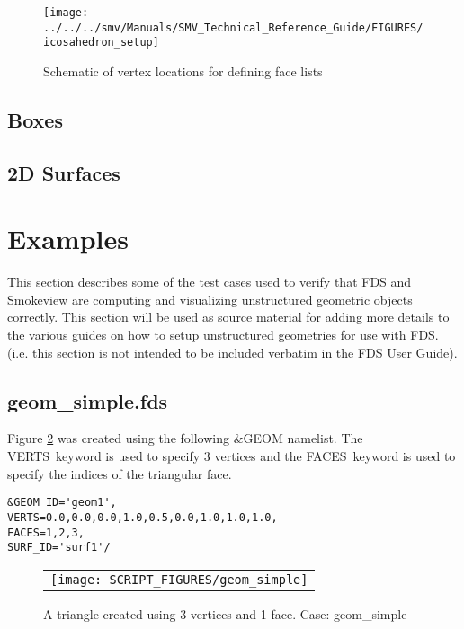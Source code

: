 \documentclass[12pt]{article}
\begin{document}
\begin{figure}
\begin{center}
\texttt{[image: ../../../smv/Manuals/SMV\_Technical\_Reference\_Guide/FIGURES/icosahedron\_setup]}
\end{center}
\caption{Schematic of vertex locations for defining face lists}
\label{figure:facelist}
\end{figure}

\subsection{Boxes}
\subsection{2D Surfaces}

\section{Examples}
This section describes some of the test cases used to verify that FDS and Smokeview are computing
and visualizing unstructured geometric objects correctly.  This section will be used as source material for adding
more details to the various guides on how to setup unstructured geometries for use with FDS. (i.e. this section
is not intended to be included verbatim in the FDS User Guide).

\newcommand{\geominput}[1]{{\scriptsize}}
\newcommand{\figheightD}{2.75in}

\subsection{geom\_simple.fds}
Figure \ref{fig:geom_simple} was created using the following \&GEOM namelist.
The {\ct VERTS}\ keyword is used to specify 3 vertices and the {\ct FACES}\ keyword
is used to specify the indices of the triangular face.

{\small
\begin{verbatim}
&GEOM ID='geom1',
VERTS=0.0,0.0,0.0,1.0,0.5,0.0,1.0,1.0,1.0,
FACES=1,2,3,
SURF_ID='surf1'/
\end{verbatim}
}

\begin{figure}
\begin{center}
\begin{tabular}{c}
 \texttt{[image: SCRIPT\_FIGURES/geom\_simple]}
  \end{tabular}
\end{center}
 \caption{A triangle created using 3 vertices and 1 face. Case: geom\_simple}
\label{fig:geom_simple}
\end{figure}
\end{document}
